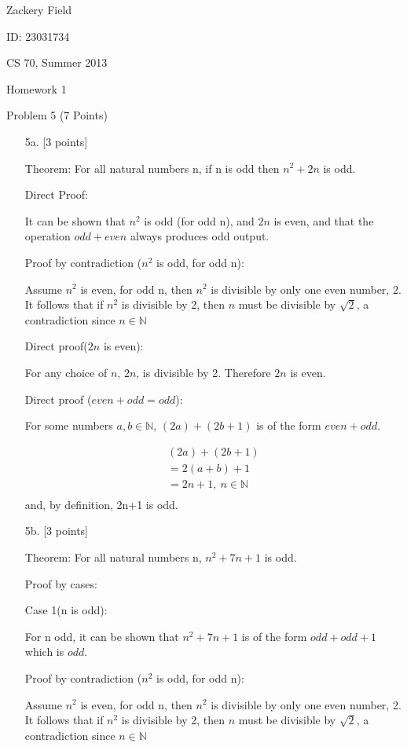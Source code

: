 \documentclass[11pt,letterpaper]{article}
\begin{document}
Zackery Field

ID: 23031734

CS 70, Summer 2013

Homework 1 

Problem 5 (7 Points)
\bigskip

\begin{enumerate}
\item[5a.] [3 points]

Theorem:
For all natural numbers n, if n is odd then $n^2 + 2n$ is odd.

Direct Proof:

It can be shown that $n^2$ is odd (for odd n), and $2n$ is even, and that the operation $odd + even$ always produces odd output.

Proof by contradiction ($n^2$ is odd, for odd n):

Assume $n^2 $ is even, for odd n, then $n^2 $ is divisible by only one even number, 2. It follows that if $n^2$ is divisible by 2, then $n$ must be divisible by $\sqrt{2}$, a contradiction since $n \in \mathbb{N}$

Direct proof($2n$ is even):

For any choice of $n$, $2n$, is divisible by 2. Therefore $2n$ is even. 

Direct proof ($even + odd = odd$):

For some numbers $a,b \in \mathbb{N}$, $(2a) + (2b+1)$ is of the form $even + odd$.

\begin{eqnarray}
(2a) + (2b+1) \\
= 2(a+b) + 1 \\
= 2n + 1, \: n \in \mathbb{N} \\
\end{eqnarray}
and, by definition, 2n+1 is odd.


\bigskip
\item[5b.][3 points]

Theorem:
For all natural numbers n, $n^2 + 7n + 1$ is odd.

Proof by cases:

Case 1(n is odd):

For n odd, it can be shown that $n^2 + 7n + 1$ is of the form $odd + odd + 1$ which is $odd$.

Proof by contradiction ($n^2$ is odd, for odd n):

Assume $n^2 $ is even, for odd n, then $n^2 $ is divisible by only one even number, 2. It follows that if $n^2$ is divisible by 2, then $n$ must be divisible by $\sqrt{2}$, a contradiction since $n \in \mathbb{N}$


\end{enumerate}
\end{document}
